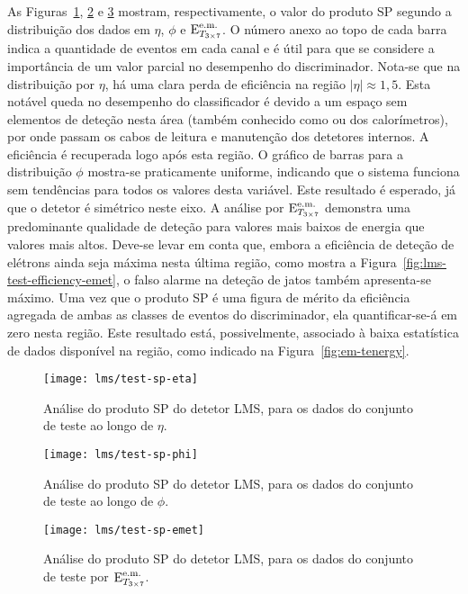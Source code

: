 As Figuras~\ref{fig:lms-test-sp-eta}, \ref{fig:lms-test-sp-phi} e
\ref{fig:lms-test-sp-emet} mostram, respectivamente, o valor do produto SP segundo
a distribuição dos dados em $\eta$, $\phi$ e $\text{E}^{\text{e.m.}}_{T_{3\times7}}$. O número anexo ao topo
de cada barra indica a quantidade de eventos em cada canal e é útil para que
se considere a importância de um valor parcial no desempenho do
discriminador. Nota-se que na distribuição por $\eta$, há uma clara perda de
eficiência na região $|\eta| \approx 1,5$. Esta notável queda no desempenho do
classificador é devido a um espaço sem elementos de deteção nesta área (também
conhecido como  ou  dos calorímetros), por onde passam os
cabos de leitura e manutenção dos detetores internos. A eficiência é
recuperada logo após esta região. O gráfico de barras para a distribuição
$\phi$ mostra-se praticamente uniforme, indicando que o sistema funciona sem
tendências para todos os valores desta variável. Este resultado é esperado, já
que o detetor é simétrico neste eixo. A análise por $\text{E}^{\text{e.m.}}_{T_{3\times7}}$ demonstra uma
predominante qualidade de deteção para valores mais baixos de energia que
valores mais altos. Deve-se levar em conta que, embora a eficiência de deteção
de elétrons ainda seja máxima nesta última região, como mostra a
Figura~\ref{fig:lms-test-efficiency-emet}, o falso alarme na deteção de jatos
também apresenta-se máximo. Uma vez que o produto SP é uma figura de mérito da
eficiência agregada de ambas as classes de eventos do discriminador, ela
quantificar-se-á em zero nesta região. Este resultado está, possivelmente,
associado à baixa estatística de dados disponível na região, como indicado na
Figura~\ref{fig:em-tenergy}.

\begin{figure}
\begin{center}
\texttt{[image: lms/test-sp-eta]}
\end{center}
\caption{Análise do produto SP do detetor LMS, para os dados do conjunto de
teste ao longo de $\eta$.}
\label{fig:lms-test-sp-eta}
\end{figure}

\begin{figure}
\begin{center}
\texttt{[image: lms/test-sp-phi]}
\end{center}
\caption{Análise do produto SP do detetor LMS, para os dados do conjunto de
teste ao longo de $\phi$.} 
\label{fig:lms-test-sp-phi}
\end{figure}

\begin{figure}
\begin{center}
\texttt{[image: lms/test-sp-emet]}
\end{center}
\caption{Análise do produto SP do detetor LMS, para os dados do conjunto de
teste por $\text{E}^{\text{e.m.}}_{T_{3\times7}}$.} 
\label{fig:lms-test-sp-emet}
\end{figure}


